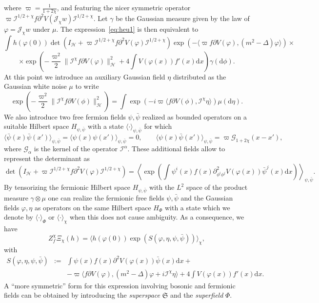 \documentclass[a4paper,10pt]{article}
\newcommand{\assign}{:=}
\newcommand{\comma}{{,}}
\newcommand{\mathd}{\mathrm{d}}
\newcommand{\tmtextit}[1]{{\itshape{#1}}}
\begin{document}
where $\varpi = \frac{1}{1 + 2 \chi}$, and featuring the nicer symmetric
operator $\varpi \mathcal{I}^{1 / 2 + \chi} f \partial^2 V (\mathcal{J}_{\chi}
w) \mathcal{I}^{1 / 2 + \chi}$. Let $\gamma$ be the Gaussian measure given by
the law of $\varphi =\mathcal{J}_{\chi} w$ under $\mu$. The
expression~{\eqref{eq:heu1}} is then equivalent to
\[ \int h (\varphi (0)) \det (I_{\mathcal{H}} + \varpi \mathcal{I}^{1 / 2 +
   \chi} f \partial^2 V (\varphi) \mathcal{I}^{1 / 2 + \chi}) \exp (- \langle
   \varpi f \partial V (\varphi), (m^2 - \Delta) \varphi \rangle) \times \]
\[ \times \exp \left( - \frac{\varpi^2}{2} \|\mathcal{I}^{\chi} f \partial V
   (\varphi) \|^2_{\mathcal{H}} + 4 \int V (\varphi (x)) f' (x) \mathd x
   \right) \gamma (\mathd \phi) . \]
At this point we introduce an auxiliary Gaussian field $\eta$ distributed as
the Gaussian white noise $\mu$ to write
\[ \exp \left( - \frac{\varpi^2}{2} \|\mathcal{I}^{\chi} f \partial V (\phi)
   \|^2_{\mathcal{H}} \right) = \int \exp (- i \varpi \langle f \partial V
   (\phi), \mathcal{I}^{\chi} \eta \rangle) \mu (\mathd \eta) . \]
We also introduce two free fermion fields $\psi, \bar{\psi}$ realized as
bounded operators on a suitable Hilbert space $H_{\psi, \bar{\psi}}$ with a
state $\langle \cdot \rangle_{\psi \comma \bar{\psi}}$ for which
\[ \langle \bar{\psi} (x) \bar{\psi} (x') \rangle_{\psi \comma \bar{\psi}} =
   \langle \psi (x) \psi (x') \rangle_{\psi \comma \bar{\psi}} = 0, \qquad
   \langle \psi (x) \bar{\psi} (x') \rangle_{\psi \comma \bar{\psi}} = \varpi
   \mathcal{G}_{1 + 2 \chi} (x - x'), \]
where $\mathcal{G}_{\alpha}$ is the kernel of the operator
$\mathcal{I}^{\alpha}$. These additional fields allow to represent the
determinant as
\[ \det (I_{\mathcal{H}} + \varpi \mathcal{I}^{1 / 2 + \chi} f \partial^2 V
   (\varphi) \mathcal{I}^{1 / 2 + \chi}) = \left\langle \exp \left( \int
   \psi^i (x) f (x) \partial^2_{\phi^i \phi^j} V (\varphi (x)) \bar{\psi}^j
   (x) \mathd x \right) \right\rangle_{\psi, \bar{\psi}} . \]
By tensorizing the fermionic Hilbert space $H_{\psi, \bar{\psi}}$ with the
$L^2$ space of the product measure $\gamma \otimes \mu$ one can realize the
fermionic free fields $\psi, \bar{\psi}$ and the Gaussian fields $\varphi,
\eta$ as operators on the same Hilbert space $H_{\Phi}$ with a state which we
denote by $\langle \cdot \rangle_{\Phi}$ or $\langle \cdot \rangle_{\chi}$
when this does not cause ambiguity. As a consequence, we have
\[ Z_f^{\chi} \Xi_{\chi} (h) = \langle h (\varphi (0)) \exp (S (\varphi, \eta,
   \psi, \bar{\psi})) \rangle_{\chi}, \]
with
\begin{eqnarray*}
  S (\varphi, \eta, \psi, \bar{\psi}) & \assign & \int \psi (x) f (x)
  \partial^2 V (\varphi (x)) \bar{\psi} (x) \mathd x +\\
  &  & - \varpi \langle f \partial V (\varphi), (m^2 - \Delta) \varphi +
  i\mathcal{I}^{\chi} \eta \rangle + 4 \int V (\varphi (x)) f' (x) \mathd x.
\end{eqnarray*}
A ``more symmetric'' form for this expression involving bosonic and fermionic
fields can be obtained by introducing the \tmtextit{superspace} $\mathfrak{S}$
and the \tmtextit{superfield} $\Phi$.
\end{document}
